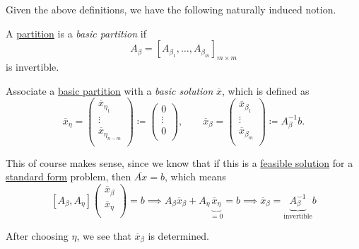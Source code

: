 Given the above definitions, we have the following naturally induced notion.

\begin{definition}\label{def:basic-partition}
	A \hyperref[def:partition]{partition} is a \emph{basic partition} if
	\[
		A_{\beta} = \left[ A_{\beta_1}, \ldots , A_{\beta_m} \right]_{m\times m}
	\]
	is invertible.
\end{definition}

\begin{definition}\label{def:basic-solution}
	Associate a \hyperref[def:basic-partition]{basic partition} with a \emph{basic solution} \(\overline{x}\), which is defined as
	\[
		\overline{x}_{\eta} = \begin{pmatrix}
			\overline{x}_{\eta_1}     \\
			\vdots                    \\
			\overline{x}_{\eta_{n-m}} \\
		\end{pmatrix}\coloneqq \begin{pmatrix}
			0      \\
			\vdots \\
			0      \\
		\end{pmatrix},\qquad \overline{x}_{\beta} = \begin{pmatrix}
			\overline{x}_{\beta_1} \\
			\vdots                 \\
			\overline{x}_{\beta_m} \\
		\end{pmatrix}\coloneqq A^{-1}_{\beta}b.
	\]
\end{definition}

\begin{intuition}
	This of course makes sense, since we know that if this is a \hyperref[def:feasible-solution]{feasible solution} for a \hyperref[def:standard-form]{standard form} problem,
	then \(\overline{Ax} = b\), which means
	\[
		\left[ A_{\beta}, A_{\eta} \right] \begin{pmatrix}
			\overline{x}_{\beta} \\
			\overline{x}_{\eta}  \\
		\end{pmatrix} = b \implies A_{\beta}\overline{x}_{\beta} + A_{\eta}\underbrace{\overline{x}_{\eta}}_{=0} = b\implies \overline{x}_{\beta} = \underbrace{A^{-1}_{\beta}}_{\text{invertible}}b
	\]
\end{intuition}

\begin{remark}
	After choosing \(\eta\), we see that \(\overline{x}_{\beta}\) is determined.
\end{remark}